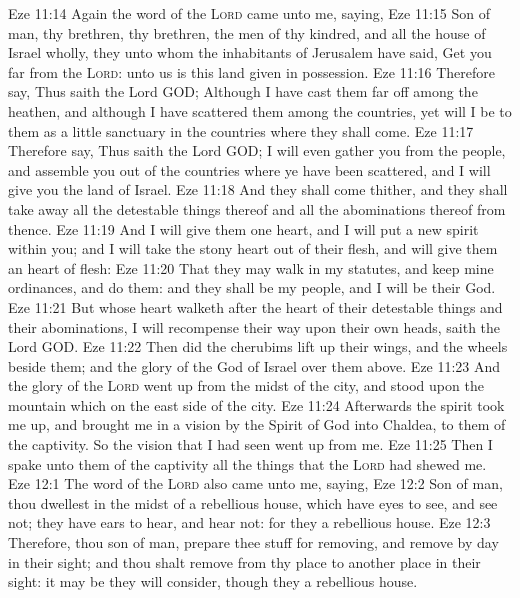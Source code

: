 \vs Eze 11:14 Again the word of the \textsc{Lord} came unto me, saying,
\vs Eze 11:15 Son of man, thy brethren,  thy brethren, the men of thy kindred, and all the house of Israel wholly,  they unto whom the inhabitants of Jerusalem have said, Get you far from the \textsc{Lord}: unto us is this land given in possession.
\vs Eze 11:16 Therefore say, Thus saith the Lord GOD; Although I have cast them far off among the heathen, and although I have scattered them among the countries, yet will I be to them as a little sanctuary in the countries where they shall come.
\vs Eze 11:17 Therefore say, Thus saith the Lord GOD; I will even gather you from the people, and assemble you out of the countries where ye have been scattered, and I will give you the land of Israel.
\vs Eze 11:18 And they shall come thither, and they shall take away all the detestable things thereof and all the abominations thereof from thence.
\vs Eze 11:19 And I will give them one heart, and I will put a new spirit within you; and I will take the stony heart out of their flesh, and will give them an heart of flesh:
\vs Eze 11:20 That they may walk in my statutes, and keep mine ordinances, and do them: and they shall be my people, and I will be their God.
\vs Eze 11:21 But  whose heart walketh after the heart of their detestable things and their abominations, I will recompense their way upon their own heads, saith the Lord GOD.
\vs Eze 11:22 Then did the cherubims lift up their wings, and the wheels beside them; and the glory of the God of Israel  over them above.
\vs Eze 11:23 And the glory of the \textsc{Lord} went up from the midst of the city, and stood upon the mountain which  on the east side of the city.
\vs Eze 11:24 Afterwards the spirit took me up, and brought me in a vision by the Spirit of God into Chaldea, to them of the captivity. So the vision that I had seen went up from me.
\vs Eze 11:25 Then I spake unto them of the captivity all the things that the \textsc{Lord} had shewed me.
\vs Eze 12:1 The word of the \textsc{Lord} also came unto me, saying,
\vs Eze 12:2 Son of man, thou dwellest in the midst of a rebellious house, which have eyes to see, and see not; they have ears to hear, and hear not: for they  a rebellious house.
\vs Eze 12:3 Therefore, thou son of man, prepare thee stuff for removing, and remove by day in their sight; and thou shalt remove from thy place to another place in their sight: it may be they will consider, though they  a rebellious house.
